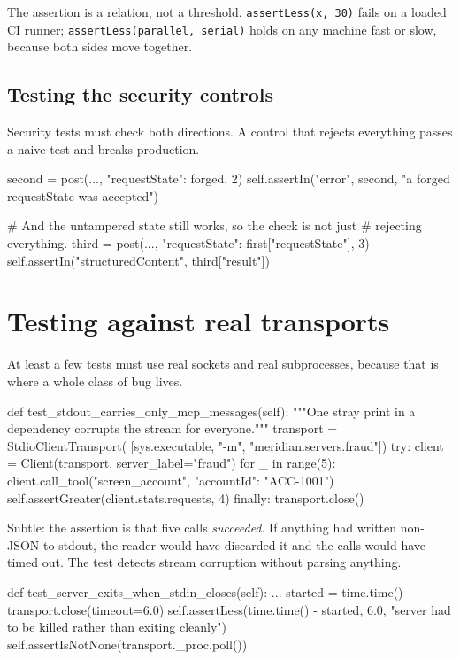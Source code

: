 The assertion is a relation, not a threshold. \texttt{assertLess(x, 30)} fails on
a loaded CI runner; \texttt{assertLess(parallel, serial)} holds on any machine
fast or slow, because both sides move together.

\subsection{Testing the security controls}

Security tests must check both directions. A control that rejects everything
passes a naive test and breaks production.

\begin{py}
second = post({..., "requestState": forged}, 2)
self.assertIn("error", second, "a forged requestState was accepted")

# And the untampered state still works, so the check is not just
# rejecting everything.
third = post({..., "requestState": first["requestState"]}, 3)
self.assertIn("structuredContent", third["result"])
\end{py}

\section{Testing against real transports}

At least a few tests must use real sockets and real subprocesses, because that
is where a whole class of bug lives.

\begin{py}
def test_stdout_carries_only_mcp_messages(self):
    """One stray print in a dependency corrupts the stream for everyone."""
    transport = StdioClientTransport(
        [sys.executable, "-m", "meridian.servers.fraud"])
    try:
        client = Client(transport, server_label="fraud")
        for _ in range(5):
            client.call_tool("screen_account", {"accountId": "ACC-1001"})
        self.assertGreater(client.stats.requests, 4)
    finally:
        transport.close()
\end{py}

Subtle: the assertion is that five calls \emph{succeeded}. If anything had
written non-JSON to stdout, the reader would have discarded it and the calls
would have timed out. The test detects stream corruption without parsing
anything.

\begin{py}
def test_server_exits_when_stdin_closes(self):
    ...
    started = time.time()
    transport.close(timeout=6.0)
    self.assertLess(time.time() - started, 6.0,
                    "server had to be killed rather than exiting cleanly")
    self.assertIsNotNone(transport._proc.poll())
\end{py}

